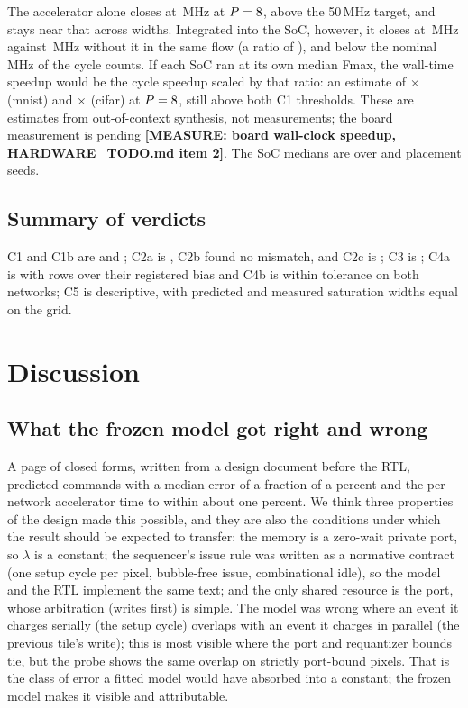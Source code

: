 \documentclass[journal]{IEEEtran}
\newcommand{\todo}[1]{{\color{red}\textbf{[#1]}}}
\begin{document}
The accelerator alone closes at \SynAccelPeightFmax{}\,MHz at $P=8$, above the 50\,MHz target, and stays near that across widths. Integrated into the SoC, however, it closes at \SynSocPeightFmax{}\,MHz against \SynSocNoAccelFmax{}\,MHz without it in the same flow (a ratio of \FmaxRatioSoc), and below the nominal \ClockMHzMnist{}\,MHz of the cycle counts. If each SoC ran at its own median Fmax, the wall-time speedup would be the cycle speedup scaled by that ratio: an estimate of \WallSpeedupEstMnist$\times$ (mnist) and \WallSpeedupEstCifar$\times$ (cifar) at $P=8$, still above both C1 thresholds. These are estimates from out-of-context synthesis, not measurements; the board measurement is pending \todo{MEASURE: board wall-clock speedup, HARDWARE\_TODO.md item 2}. The SoC medians are over \SynSocPeightFmaxSeeds{} and \SynSocNoAccelFmaxSeeds{} placement seeds.

\subsection{Summary of verdicts}
C1 and C1b are \VerdictCone{} and \VerdictConeB; C2a is \VerdictCtwoA{}, C2b found no mismatch, and C2c is \VerdictCtwoC; C3 is \VerdictCthree; C4a is \VerdictCfourA{} with \NExceed{} rows over their registered bias and C4b is within tolerance on both networks; C5 is descriptive, with predicted and measured saturation widths equal on the grid.

\section{Discussion}\label{sec:discussion}
\subsection{What the frozen model got right and wrong}
A page of closed forms, written from a design document before the RTL, predicted \MeasCfourRows{} commands with a median error of a fraction of a percent and the per-network accelerator time to within about one percent. We think three properties of the design made this possible, and they are also the conditions under which the result should be expected to transfer: the memory is a zero-wait private port, so $\lambda$ is a constant; the sequencer's issue rule was written as a normative contract (one setup cycle per pixel, bubble-free issue, combinational idle), so the model and the RTL implement the same text; and the only shared resource is the port, whose arbitration (writes first) is simple. The model was wrong where an event it charges serially (the setup cycle) overlaps with an event it charges in parallel (the previous tile's write); this is most visible where the port and requantizer bounds tie, but the probe shows the same overlap on strictly port-bound pixels. That is the class of error a fitted model would have absorbed into a constant; the frozen model makes it visible and attributable.
\end{document}
